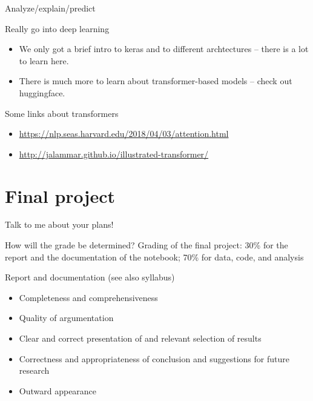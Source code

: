  
\begin{frame}{Analyze/explain/predict}
	\begin{block}{Really go into deep learning}
        \begin{itemize}
		\item We only got a brief intro to keras and to different archtectures -- there is a lot to learn here.
                \item There is much more to learn about transformer-based models -- check out huggingface.
        \end{itemize}
                \end{block}
\end{frame}


\begin{frame}{Some links about transformers}
\begin{itemize}
\item \url{https://nlp.seas.harvard.edu/2018/04/03/attention.html}
\item \url{http://jalammar.github.io/illustrated-transformer/}
\end{itemize}
\end{frame}


\section{Final project}

\begin{frame}[standout]
Talk to me about your plans!
\end{frame}

\begin{frame}{How will the grade be determined?}
Grading of the final project: 30\% for the report and the documentation of the notebook; 70\% for data, code, and analysis

\pause

\begin{block}{Report and documentation}
(see also syllabus)
\footnotesize
\begin{itemize}
\item Completeness and comprehensiveness
\item Quality of argumentation
\item Clear and correct presentation of and relevant selection of results
\item Correctness and appropriateness of conclusion and suggestions for future research
\item Outward appearance
\end{itemize}
\end{block}

\end{frame}



